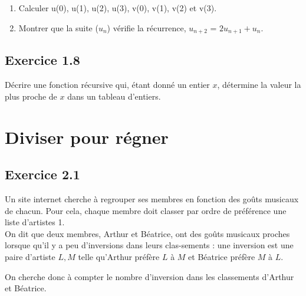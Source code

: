 \documentclass{article}[12pt]
\begin{document}
\begin{enumerate}
    \item Calculer u(0), u(1), u(2), u(3), v(0), v(1), v(2) et v(3).
    \item Montrer que la suite ($u_n$) vérifie la
récurrence, $u_{n+2}$ = $2u_{n+1} + u_n$.
\end{enumerate}


\subsection*{Exercice 1.8}
Décrire une fonction récursive qui, étant donné un entier $x$, détermine la valeur la plus proche de $x$ dans un tableau d’entiers.





\section{Diviser pour régner}

\subsection*{Exercice 2.1}

Un site internet cherche à regrouper ses membres en fonction des goûts musicaux de chacun. Pour cela,
chaque membre doit classer par ordre de préférence une liste d’artistes 1. \\

On dit que deux membres, Arthur et Béatrice, ont des goûts musicaux proches lorsque qu’il y a peu d’inversions dans leurs clas-sements : une inversion est une paire d’artiste ${L, M}$ telle qu’Arthur préfère $L$ à $M$ et Béatrice préfère
$M$ à $L$.

On cherche donc à compter le nombre d’inversion dans les classements d’Arthur et Béatrice.
\end{document}
